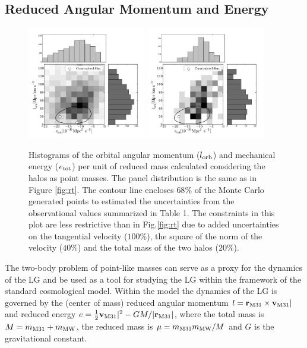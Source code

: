 \documentclass{emulateapj}
\begin{document}
\subsection{Reduced Angular Momentum and Energy}

\begin{figure}
\begin{center}
\includegraphics[keepaspectratio=true,width=0.46\textwidth]{./figures/test_EJ_BDM.pdf}
\includegraphics[keepaspectratio=true,width=0.46\textwidth]{./figures/test_EJ_BDM_narrow.pdf}
\caption{Histograms of the orbital angular momentum ($l_{\rm orb}$)
  and mechanical energy ($e_{\rm tot}$) per unit of reduced mass
  calculated considering the halos as point masses. The panel
  distribution is the same as in Figure \ref{fig:rt}. The contour line
  encloses $68\%$ of the Monte Carlo generated points to estimated the
  uncertainties from the observational values summarized in Table
  1. The constraints in this plot are less restrictive than in
  Fig.\ref{fig:rt} due to added uncertainties on the tangential
  velocity ($100\%$), the square of the norm of the velocity ($40\%$)
  and the total mass of the two halos ($20\%$). } 
\label{fig:EJ}
\end{center}
\end{figure}


The two-body problem of point-like masses can serve as a proxy for the
dynamics of the LG and be used as a tool for  studying the LG within
the framework of the standard cosmological model. Within the model the
dynamics of the LG is governed by the (center of mass)  reduced
angular momentum $l= {{\bf r}_{\rm M31}}\times{\bf v}_{\rm M31}|$ and
reduced energy  $e=\frac{1}{2} {\bf v}_{\rm M31}|^2 - G M/|{\bf
  r}_{\rm M31}|$,  where the total mass is $M=m_{\rm M31}+m_{\rm MW}$,
the reduced mass is $\mu=m_{\rm M31}m_{\rm MW}/M$ and $G$ is the
gravitational constant.  
\end{document}
